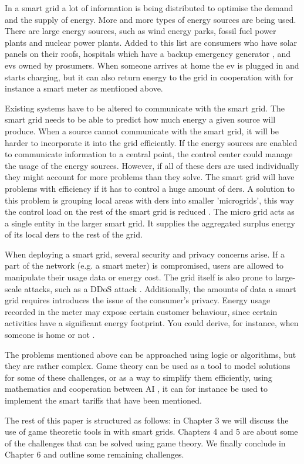 In a smart grid a lot of information is being distributed to optimise the demand and the supply of energy. More and more types of energy sources are being used. There are large energy sources, such as wind energy parks, fossil fuel power plants and nuclear power plants. Added to this list are consumers who have solar panels on their roofs, hospitals which have a backup emergency generator \cite{Kumagai2012}, and \acp{ev} owned by prosumers. When someone arrives at home the \ac{ev} is plugged in and starts charging, but it can also return energy to the grid in cooperation with for instance a smart meter as mentioned above.

Existing systems have to be altered to communicate with the smart grid. The smart grid needs to be able to predict how much energy a given source will produce. When a source cannot communicate with the smart grid, it will be harder to incorporate it into the grid efficiently. If the energy sources are enabled to communicate information to a central point, the control center could manage the usage of the energy sources. However, if all of these \acp{der} are used individually they might account for more problems than they solve. The smart grid will have problems with efficiency if it has to control a huge amount of \acp{der}. A solution to this problem is grouping local areas with \acp{der} into smaller 'microgrids', this way the control load on the rest of the smart grid is reduced \cite{HatziargyriouAsanoIravaniMarnay2007}. The micro grid acts as a single entity in the larger smart grid. It supplies the aggregated surplus energy of its local \acp{der} to the rest of the grid. 

When deploying a smart grid, several security and privacy concerns arise.  If a part of the network (e.g. a smart meter) is compromised, users are allowed to manipulate their usage data or energy cost. The grid itself is also prone to large-scale attacks, such as a DDoS attack \cite{McDanielMcLaughlin2009a}. Additionally, the amounts of data a smart grid requires introduces the issue of the consumer's privacy. Energy usage recorded in the meter may expose certain customer behaviour, since certain activities have a significant energy footprint. You could derive, for instance, when someone is home or not \cite{Molina-MarkhamShenoyFuEtAl2010}.

The problems mentioned above can be approached using logic or algorithms, but they are rather complex. Game theory can be used as a tool to model solutions for some of these challenges, or as a way to simplify them efficiently, using mathematics and cooperation between AI \cite{myerson2013game}, it can for instance be used to implement the smart tariffs that have been mentioned. 

The rest of this paper is structured as follows: in Chapter 3 we will discuss the use of game theoretic tools in with smart grids. Chapters 4 and 5 are about some of the challenges that can be solved using game theory. We finally conclude in Chapter 6 and outline some remaining challenges.
